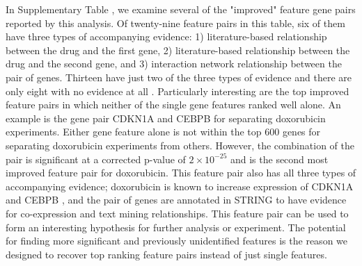 In Supplementary Table , we examine several of the "improved" feature gene pairs reported by this \genviz analysis. Of twenty-nine feature pairs in this table, six of them have three types of accompanying evidence: 1) literature-based relationship between the drug and the first gene, 2) literature-based relationship between the drug and the second gene, and 3) interaction network relationship between the pair of genes. Thirteen have just two of the three types of evidence and there are only eight with no evidence at all . Particularly interesting are the top improved feature pairs in which neither of the single gene features ranked well alone. An example is the gene pair CDKN1A and CEBPB for separating doxorubicin experiments. Either gene feature alone is not within the top 600 genes for separating doxorubicin experiments from others. However, the combination of the pair is significant at a corrected p-value of $2\times10^{-25}$ and is the second most improved feature pair for doxorubicin. This feature pair also has all three types of accompanying evidence; doxorubicin is known to increase expression of CDKN1A and CEBPB , and the pair of genes are annotated in STRING to have evidence for co-expression and text mining relationships.  This feature pair can be used to form an interesting hypothesis for further analysis or experiment. The potential for finding more significant and previously unidentified features is the reason we designed \genviz to recover top ranking feature pairs instead of just single features.




